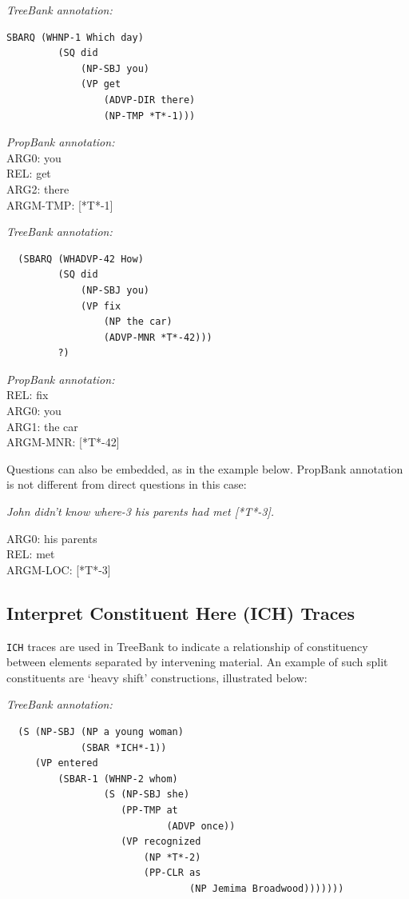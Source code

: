 \documentclass[11pt]{report}
\begin{document}
\textit{TreeBank annotation:}
\begin{verbatim}
SBARQ (WHNP-1 Which day)
         (SQ did
             (NP-SBJ you)
             (VP get
                 (ADVP-DIR there)
                 (NP-TMP *T*-1)))
\end{verbatim}

\textit{PropBank annotation:}\\
ARG0:           	you\\
REL:            	get\\
ARG2: there\\
ARGM-TMP:       [*T*-1] 

\textit{TreeBank annotation:}
\begin{verbatim}
  (SBARQ (WHADVP-42 How)
         (SQ did
             (NP-SBJ you)
             (VP fix
                 (NP the car)
                 (ADVP-MNR *T*-42)))
         ?)
\end{verbatim}

\textit{PropBank annotation:}\\
REL: fix\\
ARG0: you\\
ARG1: the car\\
ARGM-MNR:  [*T*-42]

Questions can also be embedded, as in the example below. PropBank annotation is not different from direct questions in this case:

 \textit{John didn't know where-3 his parents had met [*T*-3].}

ARG0:          	 his parents    \\           
REL:           	 met\\
ARGM-LOC:       [*T*-3]
 
\subsection{Interpret Constituent Here (ICH) Traces}
  
\texttt{ICH} traces are used in TreeBank to indicate a relationship of constituency between elements separated by intervening material. An example of such split constituents are `heavy shift' constructions, illustrated below:

\textit{TreeBank annotation:}
 \begin{verbatim}
  (S (NP-SBJ (NP a young woman)
             (SBAR *ICH*-1))
     (VP entered
         (SBAR-1 (WHNP-2 whom)
                 (S (NP-SBJ she)
                    (PP-TMP at
                            (ADVP once))
                    (VP recognized
                        (NP *T*-2)
                        (PP-CLR as
                                (NP Jemima Broadwood)))))))
 \end{verbatim}
\end{document}
